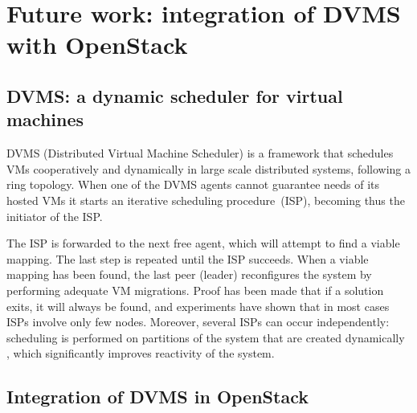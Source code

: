 \section{Future work: integration of DVMS with OpenStack}
\label{sec:future_work}

\subsection{DVMS: a dynamic scheduler for virtual machines}






DVMS \cite{quesnel:ispa2013} (Distributed Virtual Machine 
Scheduler) is a framework that schedules VMs cooperatively and dynamically in
large scale distributed systems, following a ring topology. When one of the DVMS
agents cannot guarantee needs of its hosted VMs it starts an iterative 
scheduling procedure~(ISP), becoming thus the initiator of the ISP.

The ISP is forwarded to the next free agent, which will attempt to find a viable
mapping. The last step is repeated until the ISP succeeds. When a viable mapping
has been found, the last peer (leader) reconfigures the system by performing 
adequate VM migrations. Proof has been made that if a solution exits, it will
always be found, and experiments have shown that in most cases ISPs involve 
only few nodes. Moreover, several ISPs can occur independently:
scheduling is performed on partitions of the system that are created dynamically
, which significantly improves reactivity of the system.


\subsection{Integration of DVMS in OpenStack}

\label{sub:sec:integration_dvms}


